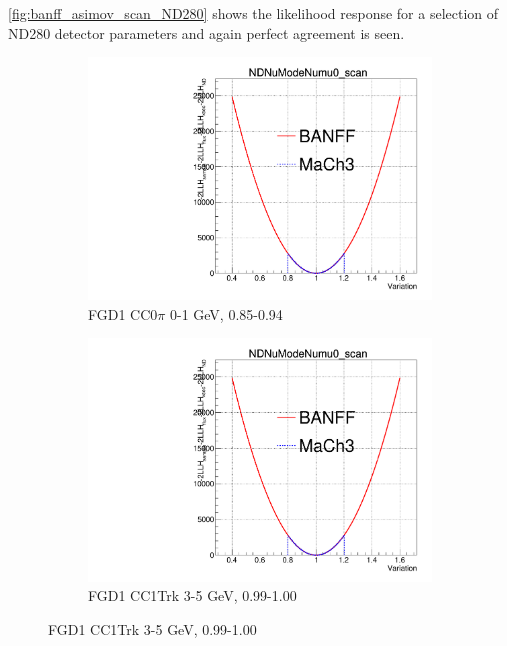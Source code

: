 \autoref{fig:banff_asimov_scan_ND280} shows the likelihood response for a selection of ND280 detector parameters and again perfect agreement is seen.
\begin{figure}[h]
	\begin{subfigure}[t]{0.24\textwidth}
		\includegraphics[width=\textwidth, trim={0mm 0mm 0mm 11mm}, clip, page=135]{figures/mach3/banff/Asimov_scan_20July_flux_Full_LLHscan_18July_BeRPA_U_ND280logL_scan}
		\caption{FGD1 CC0$\pi$ 0-1 GeV, 0.85-0.94}
	\end{subfigure}
	\begin{subfigure}[t]{0.24\textwidth}
		\includegraphics[width=\textwidth, trim={0mm 0mm 0mm 11mm}, clip, page=324]{figures/mach3/banff/Asimov_scan_20July_flux_Full_LLHscan_18July_BeRPA_U_ND280logL_scan}
		\caption{FGD1 \numubar CC1Trk 3-5 GeV, 0.99-1.00}

\end{subfigure}
\end{figure}
